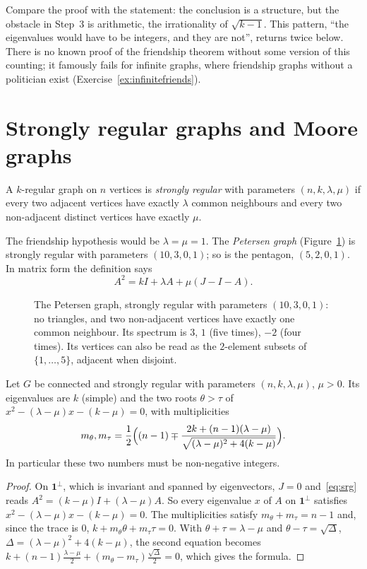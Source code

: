 Compare the proof with the statement: the conclusion is a structure, but the obstacle in Step~3 is arithmetic, the irrationality
of $\sqrt{k-1}$. This pattern, ``the eigenvalues would have to be integers, and they are not'', returns twice below. There is no
known proof of the friendship theorem without some version of this counting; it famously fails for infinite graphs, where
friendship graphs without a politician exist (Exercise~\ref{ex:infinitefriends}).

\section{Strongly regular graphs and Moore graphs}

\begin{definition}\label{def:srg}
A $k$-regular graph on $n$ vertices is \emph{strongly regular} with parameters $(n,k,\lambda,\mu)$ if every two adjacent
vertices have exactly $\lambda$ common neighbours and every two non-adjacent distinct vertices have exactly $\mu$.
\end{definition}

The friendship hypothesis would be $\lambda=\mu=1$. The \emph{Petersen graph} (Figure~\ref{fig:petersen}) is strongly regular with
parameters $(10,3,0,1)$; so is the pentagon, $(5,2,0,1)$. In matrix form the definition says
\begin{equation}\label{eq:srg}
A^2=kI+\lambda A+\mu(J-I-A).
\end{equation}

\begin{figure}[ht]
\centering
{}
\caption{The Petersen graph, strongly regular with parameters $(10,3,0,1)$: no triangles, and two non-adjacent vertices have
exactly one common neighbour. Its spectrum is $3$, $1$ (five times), $-2$ (four times). Its vertices can also be read as the
$2$-element subsets of $\{1,\dots,5\}$, adjacent when disjoint.}
\label{fig:petersen}
\end{figure}

\begin{theorem}\label{thm:srg}
Let $G$ be connected and strongly regular with parameters $(n,k,\lambda,\mu)$, $\mu>0$. Its eigenvalues are $k$ (simple) and the
two roots $\theta>\tau$ of $x^2-(\lambda-\mu)x-(k-\mu)=0$, with multiplicities
\[
m_{\theta},m_\tau=\frac12\Bigl((n-1)\mp\frac{2k+(n-1)(\lambda-\mu)}{\sqrt{(\lambda-\mu)^2+4(k-\mu)}}\Bigr).
\]
In particular these two numbers must be non-negative integers.
\end{theorem}
\begin{proof}
On $\mathbf 1^\perp$, which is invariant and spanned by eigenvectors, $J=0$ and~\eqref{eq:srg} reads $A^2=(k-\mu)I+(\lambda-\mu)A$. So
every eigenvalue $x$ of $A$ on $\mathbf 1^\perp$ satisfies $x^2-(\lambda-\mu)x-(k-\mu)=0$. The multiplicities satisfy $m_\theta+m_\tau=n-1$
and, since the trace is $0$, $k+m_\theta\theta+m_\tau\tau=0$. With $\theta+\tau=\lambda-\mu$ and $\theta-\tau=\sqrt\Delta$,
$\Delta=(\lambda-\mu)^2+4(k-\mu)$, the second equation becomes $k+(n-1)\frac{\lambda-\mu}2+(m_\theta-m_\tau)\frac{\sqrt\Delta}2=0$,
which gives the formula.
\end{proof}

